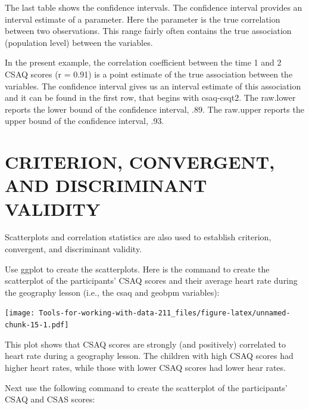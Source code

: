 \documentclass[
]{book}
\newenvironment{Shaded}{\begin{snugshade}}{\end{snugshade}}
\newcommand{\DataTypeTok}[1]{\textcolor[rgb]{0.13,0.29,0.53}{#1}}
\newcommand{\KeywordTok}[1]{\textcolor[rgb]{0.13,0.29,0.53}{\textbf{#1}}}
\newcommand{\NormalTok}[1]{#1}
\newcommand{\OperatorTok}[1]{\textcolor[rgb]{0.81,0.36,0.00}{\textbf{#1}}}
\newcommand{\StringTok}[1]{\textcolor[rgb]{0.31,0.60,0.02}{#1}}
\begin{document}
The last table shows the confidence intervals. The confidence interval provides an interval estimate of a parameter. Here the parameter is the true correlation between two observations. This range fairly often contains the true association (population level) between the variables.

In the present example, the correlation coefficient between the time 1 and 2 CSAQ scores (r = 0.91) is a point estimate of the true association between the variables. The confidence interval gives us an interval estimate of this association and it can be found in the first row, that begins with csaq-csqt2. The raw.lower reports the lower bound of the confidence interval, .89. The raw.upper reports the upper bound of the confidence interval, .93.

\hypertarget{criterion-convergent-and-discriminant-validity}{%
\section{CRITERION, CONVERGENT, AND DISCRIMINANT VALIDITY}\label{criterion-convergent-and-discriminant-validity}}

Scatterplots and correlation statistics are also used to establish criterion, convergent, and discriminant validity.

Use ggplot to create the scatterplots. Here is the command to create the scatterplot of the participants' CSAQ scores and their average heart rate during the geography lesson (i.e., the csaq and geobpm variables):

\begin{Shaded}
\end{Shaded}

\texttt{[image: Tools-for-working-with-data-211\_files/figure-latex/unnamed-chunk-15-1.pdf]}

This plot shows that CSAQ scores are strongly (and positively) correlated to heart rate during a geography lesson. The children with high CSAQ scores had higher heart rates, while those with lower CSAQ scores had lower hear rates.

Next use the following command to create the scatterplot of the participants' CSAQ and CSAS scores:
\end{document}

